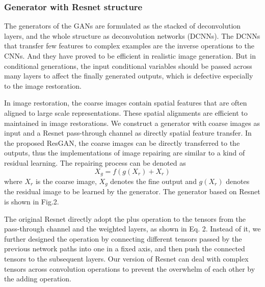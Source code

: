 \documentclass[publish,JACIII,paper]{jaciiiarticle}
\begin{document}

\subsubsection{Generator with Resnet structure}
The generators of the GANs are formulated as the stacked of deconvolution layers,
and the whole structure as deconvolution networks (DCNNs).
The DCNNs that transfer few features to complex examples are the inverse operations to the CNNs.
And  they have proved to be efficient in realistic image generation.
But in conditional generations, the input conditional variables should be passed across many layers to affect the finally generated outputs,
which is defective especially to the image restoration.

In image restoration, the coarse images contain spatial features that are often aligned to large scale representations.
These spatial alignments are efficient to maintained in image restorations.
We construct a generator with coarse images as input and a Resnet pass-through channel as directly spatial feature transfer. 
In the proposed ResGAN, the coarse images can be directly transferred to the outputs, 
thus the implementations of image repairing are similar to a kind of residual learning.
The repairing process can be denoted as
\begin{equation}
   X_g = f(g(X_r) + X_r)
\end{equation}
where $X_r$ is the coarse image, $X_g$ denotes the fine output 
and $g(X_r)$ denotes the residual image to be learned by the generator.
The generator based on Resnet is shown in Fig.2.
 

The original Resnet directly adopt the plus operation to the tensors from the pass-through channel and the weighted layers, 
as shown in Eq. 2. Instead of it, we further designed the operation by connecting different tensors passed by the previous network paths into one in a fixed axis,
and then push the connected tensors to the subsequent layers. 
Our version of Resnet can deal with complex tensors across convolution operations to prevent the overwhelm of each other by the adding operation. 
\end{document}
